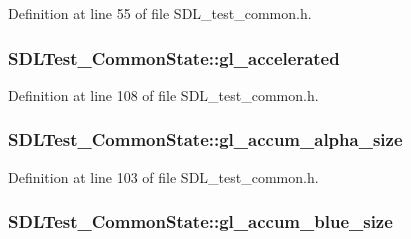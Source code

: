 Definition at line 55 of file S\-D\-L\-\_\-test\-\_\-common.\-h.

\hypertarget{struct_s_d_l_test___common_state_a2dca523be403a9ff6fe2dd7b1808baba}{
\subsubsection[{gl\-\_\-accelerated}]{ S\-D\-L\-Test\-\_\-\-Common\-State\-::gl\-\_\-accelerated}}\label{struct_s_d_l_test___common_state_a2dca523be403a9ff6fe2dd7b1808baba}


Definition at line 108 of file S\-D\-L\-\_\-test\-\_\-common.\-h.

\hypertarget{struct_s_d_l_test___common_state_ab6dddf75a40c53343199fe724a2af32b}{
\subsubsection[{gl\-\_\-accum\-\_\-alpha\-\_\-size}]{ S\-D\-L\-Test\-\_\-\-Common\-State\-::gl\-\_\-accum\-\_\-alpha\-\_\-size}}\label{struct_s_d_l_test___common_state_ab6dddf75a40c53343199fe724a2af32b}


Definition at line 103 of file S\-D\-L\-\_\-test\-\_\-common.\-h.

\hypertarget{struct_s_d_l_test___common_state_a3d23ac90e722af5098e7869a7302c119}{
\subsubsection[{gl\-\_\-accum\-\_\-blue\-\_\-size}]{ S\-D\-L\-Test\-\_\-\-Common\-State\-::gl\-\_\-accum\-\_\-blue\-\_\-size}}\label{struct_s_d_l_test___common_state_a3d23ac90e722af5098e7869a7302c119}


